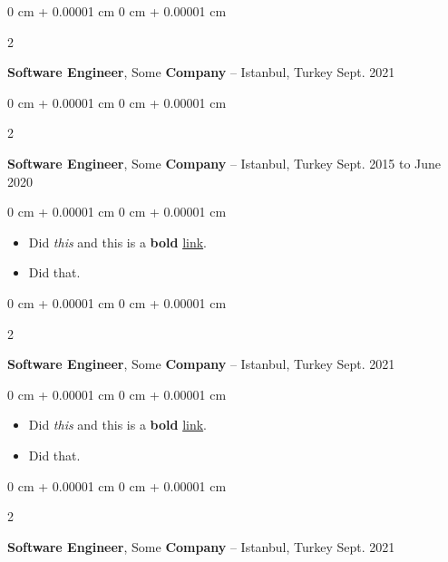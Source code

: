 \documentclass[10pt, letterpaper]{article}
\newenvironment{highlights}{
    \begin{itemize}[
        topsep=0.10 cm,
        parsep=0.10 cm,
        partopsep=0pt,
        itemsep=0pt,
        leftmargin=0 cm + 10pt
    ]
}{
    \end{itemize}
} %
\newenvironment{onecolentry}{
    \begin{adjustwidth}{
        0 cm + 0.00001 cm
    }{
        0 cm + 0.00001 cm
    }
}{
    \end{adjustwidth}
} %
\newenvironment{twocolentry}[2][]{
    \onecolentry
    \def\secondColumn{#2}
    \setcolumnwidth{\fill, 4.5 cm}
    \begin{paracol}{2}
}{
    \switchcolumn \raggedleft \secondColumn
    \end{paracol}
    \endonecolentry
} %
\begin{document}
        \vspace{0.2 cm}

        \begin{twocolentry}{
            Sept. 2021
        }
            \textbf{Software Engineer}, Some \textbf{Company} -- Istanbul, Turkey\end{twocolentry}



        \vspace{0.2 cm}

        \begin{twocolentry}{
            Sept. 2015 to June 2020
        }
            \textbf{Software Engineer}, Some \textbf{Company} -- Istanbul, Turkey\end{twocolentry}

        \vspace{0.10 cm}
        \begin{onecolentry}
            \begin{highlights}
                \item Did \textit{this} and this is a \textbf{bold} \href{https://example.com}{link}.
                \item Did that.
            \end{highlights}
        \end{onecolentry}


        \vspace{0.2 cm}

        \begin{twocolentry}{
            Sept. 2021
        }
            \textbf{Software Engineer}, Some \textbf{Company} -- Istanbul, Turkey\end{twocolentry}

        \vspace{0.10 cm}
        \begin{onecolentry}
            \begin{highlights}
                \item Did \textit{this} and this is a \textbf{bold} \href{https://example.com}{link}.
                \item Did that.
            \end{highlights}
        \end{onecolentry}


        \vspace{0.2 cm}

        \begin{twocolentry}{
            Sept. 2021
        }
            \textbf{Software Engineer}, Some \textbf{Company} -- Istanbul, Turkey\end{twocolentry}
\end{document}
